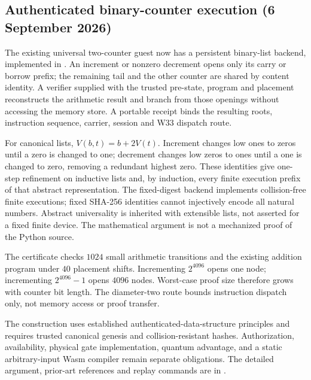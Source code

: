 \subsection*{Authenticated binary-counter execution (6 September 2026)}
The existing universal two-counter guest now has a persistent binary-list
backend, implemented in
\texttt{}.
An increment or nonzero decrement opens only its carry or borrow prefix;
the remaining tail and the other counter are shared by content identity.
A verifier supplied with the trusted pre-state, program and placement
reconstructs the arithmetic result and branch from those openings without
accessing the memory store. A portable receipt binds the resulting roots,
instruction sequence, carrier, session and W33 dispatch route.

For canonical lists, $V(b,t)=b+2V(t)$. Increment changes low ones to zeros
until a zero is changed to one; decrement changes low zeros to ones until
a one is changed to zero, removing a redundant highest zero. These identities
give one-step refinement on inductive lists and, by induction, every finite
execution prefix of that abstract representation. The fixed-digest backend
implements collision-free finite executions; fixed SHA-256 identities cannot
injectively encode all natural numbers. Abstract universality is inherited
with extensible lists, not asserted for a fixed finite device.
The mathematical argument is not a mechanized proof of the Python source.

The certificate checks $1024$ small arithmetic transitions and the existing
addition program under $40$ placement shifts. Incrementing $2^{4096}$ opens
one node; incrementing $2^{4096}-1$ opens $4096$ nodes. Worst-case proof size
therefore grows with counter bit length. The diameter-two route bounds
instruction dispatch only, not memory access or proof transfer.

The construction uses established authenticated-data-structure principles
and requires trusted canonical genesis and collision-resistant hashes.
Authorization, availability, physical gate implementation, quantum advantage,
and a static arbitrary-input Wasm compiler remain separate obligations.
The detailed argument, prior-art references and replay commands are in
\texttt{}.
